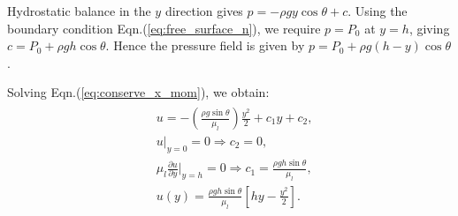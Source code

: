 \documentclass{article}
\begin{document}
Hydrostatic balance in the $y$ direction gives $p = -\rho g y \cos{\theta} + c$. Using the boundary condition Eqn.(\ref{eq:free_surface_n}), we require $p  = P_{0}$ at $y = h$, giving $ c = P_{0} + \rho g h \cos{\theta}$. Hence the pressure field is given by $\boxed{p = P_{0} + \rho g (h-y) \cos{\theta}}$.

Solving Eqn.(\ref{eq:conserve_x_mom}), we obtain: 
\begin{align}
 \begin{split}
  & u = -\left(\frac{\rho g \sin{\theta}}{\mu_{l}} \right)  \frac{y^{2}}{2} + c_{1} y + c_{2},\\
 & u|_{y=0} = 0 \Rightarrow c_{2} = 0, \\
 & \mu_{l}\frac{\partial u}{\partial y}\bigg|_{y = h} = 0 \Rightarrow c_{1} = \frac{\rho g h \sin{\theta}}{\mu_{l}},\\
 & \boxed{ u(y) = \frac{\rho g h \sin{\theta}}{\mu_{l}} \left[hy - \frac{y^{2}}{2} \right]}.
 \end{split}
\end{align}


 \if@openright\cleardoublepage\else\clearpage\fi
 \cleardoublepage
 \pagestyle{empty}
\end{document}
